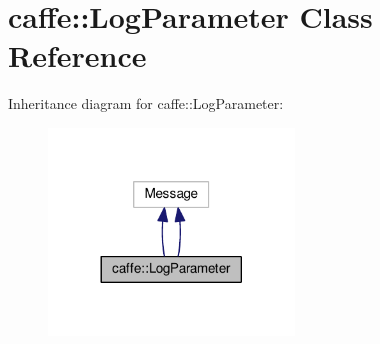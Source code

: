\hypertarget{classcaffe_1_1_log_parameter}{}\section{caffe\+:\+:Log\+Parameter Class Reference}
\label{classcaffe_1_1_log_parameter}


Inheritance diagram for caffe\+:\+:Log\+Parameter\+:
\nopagebreak
\begin{figure}[H]
\begin{center}
\leavevmode
\includegraphics[width=185pt]{classcaffe_1_1_log_parameter__inherit__graph}
\end{center}
\end{figure}
